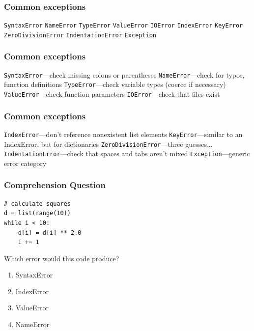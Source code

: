 \documentclass[11pt]{beamer}
\begin{document}
\begin{frame}[fragile]
  \frametitle{Common exceptions}
  \Enlarge

  \begin{enumerate}
  \myitem  \texttt{SyntaxError}
  \myitem  \texttt{NameError}
  \myitem  \texttt{TypeError}
  \myitem  \texttt{ValueError}
  \myitem  \texttt{IOError}
  \myitem  \texttt{IndexError}
  \myitem  \texttt{KeyError}
  \myitem  \texttt{ZeroDivisionError}
  \myitem  \texttt{IndentationError}
  \myitem  \texttt{Exception}
  \end{enumerate}
\end{frame}

\begin{frame}[fragile]
  \frametitle{Common exceptions}
  \Enlarge

  \begin{enumerate}
  \myitem \texttt{SyntaxError}---check missing colons or parentheses
  \myitem \texttt{NameError}---check for typos, function definitions
  \myitem \texttt{TypeError}---check variable types (coerce if necessary)
  \myitem \texttt{ValueError}---check function parameters
  \myitem \texttt{IOError}---check that files exist
  \end{enumerate}
\end{frame}

\begin{frame}[fragile]
  \frametitle{Common exceptions}
  \Enlarge

  \begin{enumerate}
  \myitem \texttt{IndexError}---don't reference nonexistent list elements
  \myitem \texttt{KeyError}---similar to an IndexError, but for dictionaries
  \myitem  \texttt{ZeroDivisionError}---three guesses...
  \myitem  \texttt{IndentationError}---check that spaces and tabs aren't mixed
  \myitem  \texttt{Exception}---generic error category
  \end{enumerate}
\end{frame}

\begin{frame}[fragile]
  \frametitle{Comprehension Question}
  \Enlarge

  \begin{Verbatim}
# calculate squares
d = list(range(10))
while i < 10:
    d[i] = d[i] ** 2.0
    i += 1
  \end{Verbatim}

  Which error would this code produce?

  \begin{enumerate}[label=\Alph*]
  \item  SyntaxError
  \item  IndexError
  \item  ValueError
  \item  NameError
  \end{enumerate}
\end{frame}
\end{document}
